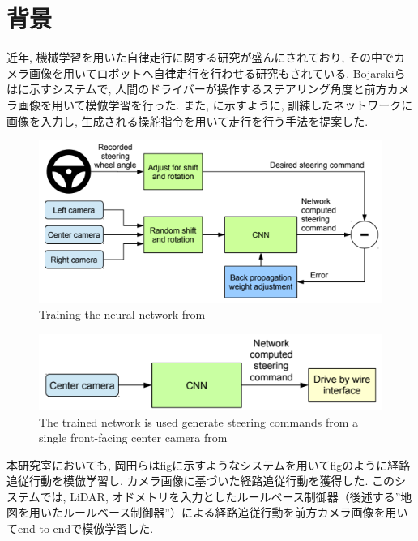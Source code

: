 
\section{背景}
近年, 機械学習を用いた自律走行に関する研究が盛んにされており, その中でカメラ画像を用いてロボットへ自律走行を行わせる研究もされている. Bojarskiら\cite{bojarski}はに示すシステムで, 人間のドライバーが操作するステアリング角度と前方カメラ画像を用いて模倣学習を行った. また, に示すように, 訓練したネットワークに画像を入力し, 生成される操舵指令を用いて走行を行う手法を提案した.

\vspace{0.5cm}

\begin{figure}[hbtp]
  \centering
 \includegraphics[keepaspectratio, scale=0.9]
      {images/bojarski_train.png}
 \caption{Training the neural network from \cite{bojarski}}
 \label{Fig:bojarski_train}
\end{figure}

\begin{figure}[hbtp]
     \centering
    \includegraphics[keepaspectratio, scale=0.6]
         {images/bojarski_test.png}
    \caption{The trained network is used generate steering commands from a single front-facing center camera from \cite{bojarski}}
    \label{Fig:bojarski_test}
\end{figure}

\newpage

本研究室においても, 岡田ら\cite{okada1}はfigに示すようなシステムを用いてfigのように経路追従行動を模倣学習し, カメラ画像に基づいた経路追従行動を獲得した. このシステムでは, LiDAR, オドメトリを入力としたルールベース制御器（後述する”地図を用いたルールベース制御器”）による経路追従行動を前方カメラ画像を用いてend-to-endで模倣学習した. 

